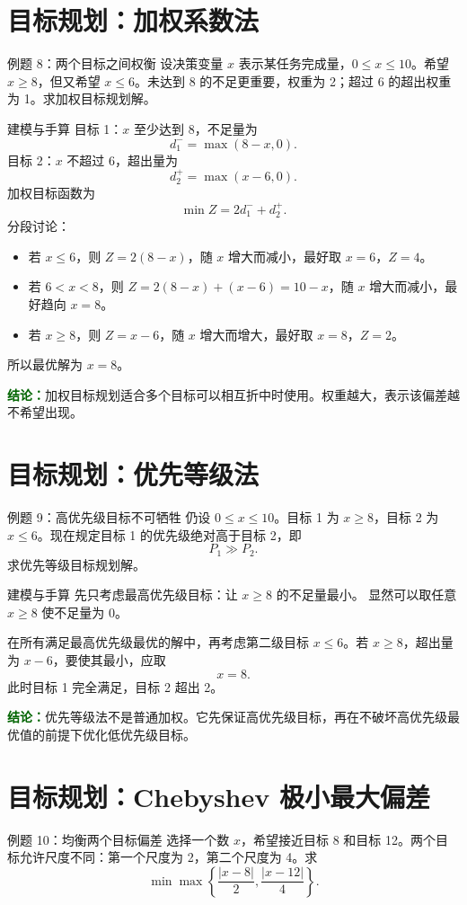 \documentclass[UTF8,12pt,a4paper]{ctexart}
\newcommand{\conclusion}[1]{\par\smallskip\noindent\textcolor{darkgreen}{\textbf{结论：}}#1\par\smallskip}
\begin{document}
\section{目标规划：加权系数法}
\begin{examplebox}{例题 8：两个目标之间权衡}
设决策变量 $x$ 表示某任务完成量，$0\le x\le10$。希望 $x\ge8$，但又希望 $x\le6$。未达到 8 的不足更重要，权重为 2；超过 6 的超出权重为 1。求加权目标规划解。
\end{examplebox}

\begin{solbox}{建模与手算}
目标 1：$x$ 至少达到 8，不足量为
\[
d_1^- =\max(8-x,0).
\]
目标 2：$x$ 不超过 6，超出量为
\[
d_2^+ =\max(x-6,0).
\]
加权目标函数为
\[
\min Z=2d_1^-+d_2^+.
\]
分段讨论：
\begin{itemize}
\item 若 $x\le6$，则 $Z=2(8-x)$，随 $x$ 增大而减小，最好取 $x=6$，$Z=4$。
\item 若 $6<x<8$，则 $Z=2(8-x)+(x-6)=10-x$，随 $x$ 增大而减小，最好趋向 $x=8$。
\item 若 $x\ge8$，则 $Z=x-6$，随 $x$ 增大而增大，最好取 $x=8$，$Z=2$。
\end{itemize}
所以最优解为 $x=8$。
\end{solbox}
\conclusion{加权目标规划适合多个目标可以相互折中时使用。权重越大，表示该偏差越不希望出现。}

\section{目标规划：优先等级法}
\begin{examplebox}{例题 9：高优先级目标不可牺牲}
仍设 $0\le x\le10$。目标 1 为 $x\ge8$，目标 2 为 $x\le6$。现在规定目标 1 的优先级绝对高于目标 2，即
\[
P_1\gg P_2.
\]
求优先等级目标规划解。
\end{examplebox}

\begin{solbox}{建模与手算}
先只考虑最高优先级目标：让 $x\ge8$ 的不足量最小。
显然可以取任意 $x\ge8$ 使不足量为 0。

在所有满足最高优先级最优的解中，再考虑第二级目标 $x\le6$。若 $x\ge8$，超出量为 $x-6$，要使其最小，应取
\[
x=8.
\]
此时目标 1 完全满足，目标 2 超出 2。
\end{solbox}
\conclusion{优先等级法不是普通加权。它先保证高优先级目标，再在不破坏高优先级最优值的前提下优化低优先级目标。}

\section{目标规划：Chebyshev 极小最大偏差}
\begin{examplebox}{例题 10：均衡两个目标偏差}
选择一个数 $x$，希望接近目标 8 和目标 12。两个目标允许尺度不同：第一个尺度为 2，第二个尺度为 4。求
\[
\min \max\left\{\frac{|x-8|}{2},\frac{|x-12|}{4}\right\}.
\]
\end{examplebox}
\end{document}
